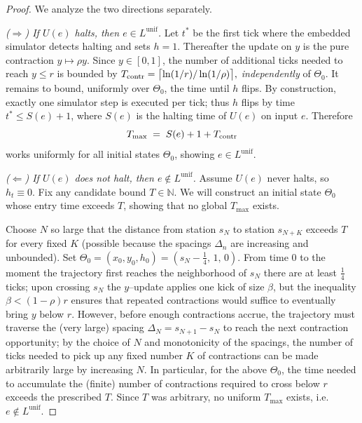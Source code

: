 \documentclass[12pt]{article}
\theoremstyle{definition}
\theoremstyle{plain}
\begin{document}
\begin{proof}
We analyze the two directions separately.

\smallskip
\emph{(\(\Rightarrow\)) If \(U(e)\) halts, then \(e\in L^{\mathrm{unif}}\).}
Let \(t^\ast\) be the first tick where the embedded simulator detects halting and
sets \(h=1\).  Thereafter the update on \(y\) is the pure contraction
\(y\mapsto \rho y\).  Since \(y\in[0,1]\), the number of additional ticks needed
to reach \(y\le r\) is bounded by
\(
  T_{\rm contr}=\bigl\lceil \ln(1/r)/\ln(1/\rho)\bigr\rceil,
\)
\emph{independently} of \(\Theta_0\).
It remains to bound, uniformly over \(\Theta_0\), the time until \(h\) flips.
By construction, exactly one simulator step is executed per tick; thus \(h\) flips
by time \(t^\ast\le S(e)+1\), where \(S(e)\) is the halting time of \(U(e)\) on
input \(e\).  Therefore
\[
  T_{\max} \;=\; S(e)+1+T_{\rm contr}
\]
works uniformly for all initial states \(\Theta_0\), showing \(e\in L^{\mathrm{unif}}\).

\smallskip
\emph{(\(\Leftarrow\)) If \(U(e)\) does not halt, then \(e\notin L^{\mathrm{unif}}\).}
Assume \(U(e)\) never halts, so \(h_t\equiv 0\).  Fix any candidate bound
\(T\in\mathbb N\).  We will construct an initial state \(\Theta_0\) whose entry
time exceeds \(T\), showing that no global \(T_{\max}\) exists.

Choose \(N\) so large that the distance from station \(s_N\) to station
\(s_{N+K}\) exceeds \(T\) for every fixed \(K\) (possible because the spacings
\(\Delta_n\) are increasing and unbounded).  Set
\(\Theta_0=(x_0,y_0,h_0)=(s_N-\tfrac14,\,1,\,0)\).
From time \(0\) to the moment the trajectory first reaches the neighborhood of
\(s_N\) there are at least \(\tfrac14\) ticks; upon crossing \(s_N\) the \(y\)–update
applies one kick of size \(\beta\), but the inequality \(\beta<(1-\rho)r\)
ensures that repeated contractions would suffice to eventually bring \(y\) below
\(r\).  However, before enough contractions accrue, the trajectory must traverse
the (very large) spacing \(\Delta_N=s_{N+1}-s_N\) to reach the next contraction
opportunity; by the choice of \(N\) and monotonicity of the spacings, the number
of ticks needed to pick up any fixed number \(K\) of contractions can be made
arbitrarily large by increasing \(N\).  In particular, for the above \(\Theta_0\),
the time needed to accumulate the (finite) number of contractions required to
cross below \(r\) exceeds the prescribed \(T\).  Since \(T\) was arbitrary, no
uniform \(T_{\max}\) exists, i.e.\ \(e\notin L^{\mathrm{unif}}\).


\end{proof}
\end{document}
